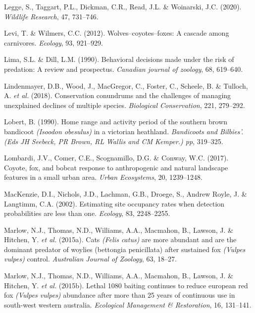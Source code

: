 \documentclass[11pt,a4paper,titlepage,twoside,openright]{style/unimelbthesis}
\begin{document}
\begin{mainmatter}
\leavevmode\hypertarget{ref-legge2020cat}{}%
Legge, S., Taggart, P.L., Dickman, C.R., Read, J.L. \& Woinarski, J.C. (2020). \emph{Wildlife Research}, 47, 731--746.

\leavevmode\hypertarget{ref-levi2012wolves}{}%
Levi, T. \& Wilmers, C.C. (2012). Wolves--coyotes--foxes: A cascade among carnivores. \emph{Ecology}, 93, 921--929.

\leavevmode\hypertarget{ref-lima1990behavioral}{}%
Lima, S.L. \& Dill, L.M. (1990). Behavioral decisions made under the risk of predation: A review and prospectus. \emph{Canadian journal of zoology}, 68, 619--640.

\leavevmode\hypertarget{ref-lindenmayer2018conservation}{}%
Lindenmayer, D.B., Wood, J., MacGregor, C., Foster, C., Scheele, B. \& Tulloch, A. \emph{et al.} (2018). Conservation conundrums and the challenges of managing unexplained declines of multiple species. \emph{Biological Conservation}, 221, 279--292.

\leavevmode\hypertarget{ref-lobert1990home}{}%
Lobert, B. (1990). Home range and activity period of the southern brown bandicoot \emph{(Isoodon obesulus)} in a victorian heathland. \emph{Bandicoots and Bilbies'.(Eds JH Seebeck, PR Brown, RL Wallis and CM Kemper.) pp}, 319--325.

\leavevmode\hypertarget{ref-lombardi2017coyote}{}%
Lombardi, J.V., Comer, C.E., Scognamillo, D.G. \& Conway, W.C. (2017). Coyote, fox, and bobcat response to anthropogenic and natural landscape features in a small urban area. \emph{Urban Ecosystems}, 20, 1239--1248.

\leavevmode\hypertarget{ref-mackenzie2002estimating}{}%
MacKenzie, D.I., Nichols, J.D., Lachman, G.B., Droege, S., Andrew Royle, J. \& Langtimm, C.A. (2002). Estimating site occupancy rates when detection probabilities are less than one. \emph{Ecology}, 83, 2248--2255.

\leavevmode\hypertarget{ref-marlow2015cats}{}%
Marlow, N.J., Thomas, N.D., Williams, A.A., Macmahon, B., Lawson, J. \& Hitchen, Y. \emph{et al.} (2015a). Cats \emph{(Felis catus)} are more abundant and are the dominant predator of woylies (bettongia penicillata) after sustained fox \emph{(Vulpes vulpes)} control. \emph{Australian Journal of Zoology}, 63, 18--27.

\leavevmode\hypertarget{ref-marlow2015lethal}{}%
Marlow, N.J., Thomas, N.D., Williams, A.A., Macmahon, B., Lawson, J. \& Hitchen, Y. \emph{et al.} (2015b). Lethal 1080 baiting continues to reduce european red fox \emph{(Vulpes vulpes)} abundance after more than 25 years of continuous use in south-west western australia. \emph{Ecological Management \& Restoration}, 16, 131--141.


\end{mainmatter}
\end{document}
